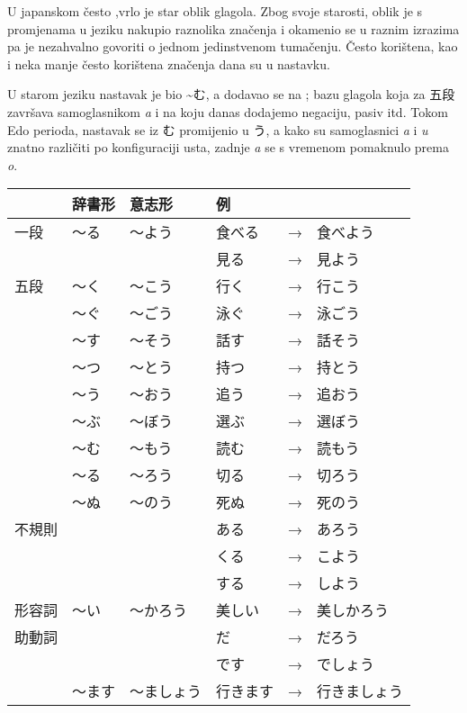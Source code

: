 
\author{Tomislav Mamić}

	
	U japanskom često ,\footnotemark[1] vrlo je star oblik glagola.
	Zbog svoje starosti, oblik je s promjenama u jeziku nakupio raznolika značenja i okamenio se u raznim izrazima pa je nezahvalno govoriti o jednom jedinstvenom tumačenju.
	Često korištena, kao i neka manje često korištena značenja dana su u nastavku.
	
	
	
	U starom jeziku nastavak je bio \textasciitilde む, a dodavao se na ; bazu glagola koja za 五段 završava samoglasnikom \textit{a} i na koju danas dodajemo negaciju, pasiv itd. Tokom Edo perioda, nastavak se iz む promijenio u う, a kako su samoglasnici \textit{a} i \textit{u} znatno različiti po konfiguraciji usta, zadnje \textit{a} se s vremenom pomaknulo prema \textit{o}.
	
	\begin{table}[h]
		\centering
		\begin{tabular}{llllll}
			\toprule[2pt]
			& 辞書形 & 意志形 & 例 & & \\
			\midrule
			一段 & 〜る & 〜よう & 食べる&→&食べよう \\
			& & & 見る&→&見よう \\
			\midrule
			五段 & 〜く & 〜こう & 行く&→&行こう\\
			& 〜ぐ & 〜ごう & 泳ぐ&→&泳ごう\\
			& 〜す & 〜そう & 話す&→&話そう\\
			& 〜つ & 〜とう & 持つ&→&持とう\\
			& 〜う & 〜おう & 追う&→&追おう\\
			& 〜ぶ & 〜ぼう & 選ぶ&→&選ぼう\\
			& 〜む & 〜もう & 読む&→&読もう\\
			& 〜る & 〜ろう & 切る&→&切ろう\\
			& 〜ぬ & 〜のう & 死ぬ&→&死のう\\
			\midrule
			不規則 & & & ある &→& あろう \\
			& & & くる &→& こよう \\
			& & & する &→& しよう \\
			\midrule
			形容詞 & 〜い & 〜かろう & 美しい&→&美しかろう \\
			\midrule
			助動詞 & & & だ &→& だろう \\
			& & & です &→& でしょう \\
			& 〜ます & 〜ましょう & 行きます&→&行きましょう \\
			\bottomrule[2pt]
		\end{tabular}
	\end{table}

